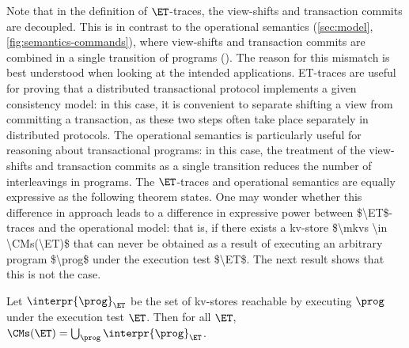 Note that in the definition of $\ET$-traces, the view-shifts and 
transaction commits  are decoupled. This is in contrast to the
operational semantics (\cref{sec:model}, \cref{fig:semantics-commands}), 
where view-shifts and transaction commits are combined in a single transition of programs (). 
The reason for this mismatch is best understood when looking at the
intended applications. 
ET-traces are useful for 
proving that a distributed transactional 
protocol implements a given consistency model: in this case, it is convenient to separate shifting a view from committing a transaction, 
as these two steps often take place separately in distributed
protocols. The operational semantics  is particularly useful for  reasoning about transactional 
programs: in this case, the treatment of the view-shifts and transaction commits as a single transition reduces the number of interleavings in programs.
The $\ET$-traces and operational semantics are equally expressive as
the following theorem states. 
\ac{One may wonder whether this difference in approach leads to a difference in expressive power between $\ET$-traces 
and the operational model: that is, if there exists a kv-store $\mkvs \in \CMs(\ET)$ that can never be obtained as a 
result of executing an arbitrary program $\prog$ under the execution test $\ET$. The next result shows that 
this is not the case.}
%

\begin{theorem}
	\label{thm:ettraces2sem}
	Let $\interpr{\prog}_{\ET}$ be the set of kv-stores reachable by executing $\prog$ under the execution test $\ET$. 
    Then for all $\ET$, $\CMs(\ET) = \bigcup_{\prog} \interpr{\prog}_{\ET}$.
\end{theorem}

